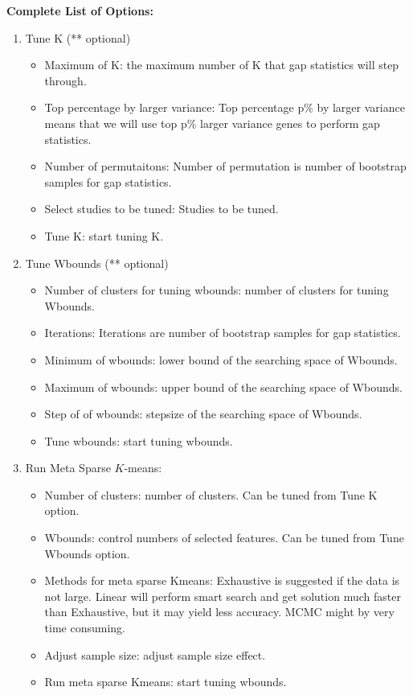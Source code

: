 \textbf{Complete List of Options:} 
\begin{enumerate}
\item Tune K (** optional)
\begin{itemize}
\item Maximum of K: the maximum number of K that gap statistics will step through.
\item Top percentage by larger variance: Top percentage p\% by larger variance means that we will use top p\% larger variance genes to perform gap statistics.
\item Number of permutaitons: Number of permutation is number of bootstrap samples for gap statistics.
\item Select studies to be tuned: Studies to be tuned.
\item Tune K: start tuning K.
\end{itemize}
\item Tune Wbounds (** optional)
\begin{itemize}
\item Number of clusters for tuning wbounds: number of clusters for tuning Wbounds.
\item Iterations: Iterations are number of bootstrap samples for gap statistics.
\item Minimum of wbounds: lower bound of the searching space of Wbounds.
\item Maximum of wbounds: upper bound of the searching space of Wbounds.
\item Step of of wbounds: stepsize of the searching space of Wbounds.
\item Tune wbounds: start tuning wbounds.
\end{itemize}
\item Run Meta Sparse $K$-means: 
\begin{itemize}
\item Number of clusters: number of clusters. Can be tuned from Tune K option.
\item Wbounds: control numbers of selected features. Can be tuned from Tune Wbounds option.
\item Methods for meta sparse Kmeans: Exhaustive is suggested if the data is not large.
Linear will perform smart search and get solution much faster than Exhaustive, 
but it may yield less accuracy.
MCMC might by very time consuming.
\item Adjust sample size: adjust sample size effect.
\item Run meta sparse Kmeans: start tuning wbounds.
\end{itemize}

\end{enumerate}


